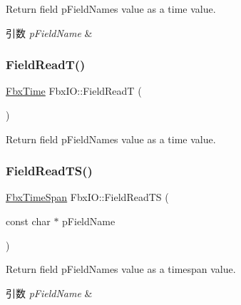 Return field p\+Field\+Name\textquotesingle{}s value as a time value. 
\begin{DoxyParams}{引数}
{\em p\+Field\+Name} & \\
\hline
\end{DoxyParams}
\mbox{\label{class_fbx_i_o_a5049f61b4999e2e9d87b2117380e9bb9}} 
\subsubsection{\texorpdfstring{Field\+Read\+T()}{FieldReadT()}\hspace{0.1cm}{\footnotesize\ttfamily [2/2]}}
{\footnotesize\ttfamily \hyperlink{class_fbx_time}{Fbx\+Time} Fbx\+I\+O\+::\+Field\+ReadT (\begin{DoxyParamCaption}{ }\end{DoxyParamCaption})}



Return field p\+Field\+Name\textquotesingle{}s value as a time value. 

\mbox{\label{class_fbx_i_o_a5abfaea0db51831505d56f5376ea3b9e}} 
\subsubsection{\texorpdfstring{Field\+Read\+T\+S()}{FieldReadTS()}\hspace{0.1cm}{\footnotesize\ttfamily [1/2]}}
{\footnotesize\ttfamily \hyperlink{class_fbx_time_span}{Fbx\+Time\+Span} Fbx\+I\+O\+::\+Field\+Read\+TS (\begin{DoxyParamCaption}\item[{const char $\ast$}]{p\+Field\+Name }\end{DoxyParamCaption})}

Return field p\+Field\+Name\textquotesingle{}s value as a timespan value. 
\begin{DoxyParams}{引数}
{\em p\+Field\+Name} & \\
\hline
\end{DoxyParams}
\mbox{\label{class_fbx_i_o_a979481e8ecba4c51413e3e7db53298da}} 
